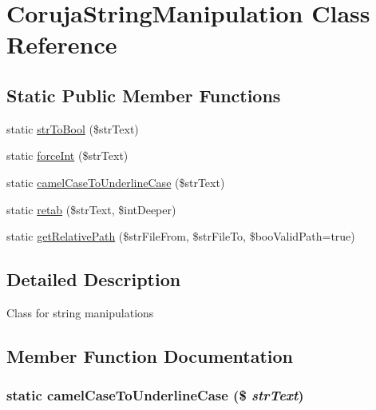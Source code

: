 \hypertarget{class_coruja_string_manipulation}{
\section{CorujaStringManipulation Class Reference}
\label{class_coruja_string_manipulation}
}
\subsection*{Static Public Member Functions}
\begin{CompactItemize}
\item 
static \hyperlink{class_coruja_string_manipulation_24ac3f5ac008091fe6fd23a4cf3523c3}{strToBool} (\$strText)
\item 
static \hyperlink{class_coruja_string_manipulation_10744dda31797395d8f7a4a56e61bb51}{forceInt} (\$strText)
\item 
static \hyperlink{class_coruja_string_manipulation_a2b166a09df3bdcfc54a064ce535f095}{camelCaseToUnderlineCase} (\$strText)
\item 
static \hyperlink{class_coruja_string_manipulation_edaa7f09264ccb66dfd8f12cb8c4b8f6}{retab} (\$strText, \$intDeeper)
\item 
static \hyperlink{class_coruja_string_manipulation_d93d1005c4ce820356bd2f4c0d15f6a3}{getRelativePath} (\$strFileFrom, \$strFileTo, \$booValidPath=true)
\end{CompactItemize}


\subsection{Detailed Description}
Class for string manipulations 

\subsection{Member Function Documentation}
\hypertarget{class_coruja_string_manipulation_a2b166a09df3bdcfc54a064ce535f095}{
\subsubsection[{camelCaseToUnderlineCase}]{\setlength{\rightskip}{0pt plus 5cm}static camelCaseToUnderlineCase (\$ {\em strText})}}
\label{class_coruja_string_manipulation_a2b166a09df3bdcfc54a064ce535f095}


